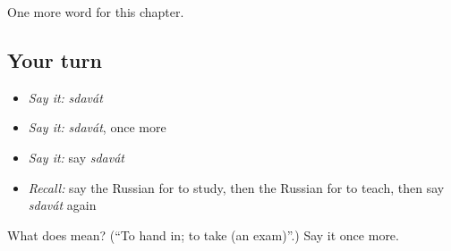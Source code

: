 \begin{grammarlens}[title={What you've built}]
One more word for this chapter.
\end{grammarlens}

\subsection*{Your turn}
\begin{itemize}
\raggedright
  \item \emph{Say it:} \emph{sdavát}
  \item \emph{Say it:} \emph{sdavát}, once more
  \item \emph{Say it:} say \emph{sdavát}
  \item \emph{Recall:} say the Russian for to study, then the Russian for to teach, then say \emph{sdavát} again
\end{itemize}

\begin{tcolorbox}[breakable,colback=teal!4,colframe=teal!35!black,title={Before you move on}]
What does  mean? (\textquotedblleft{}To hand in; to take (an exam)\textquotedblright{}.) Say it once more.
\end{tcolorbox}
